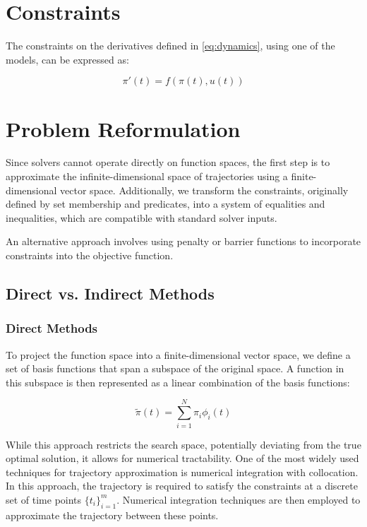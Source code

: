 \section{Constraints}

The constraints on the derivatives defined in \eqref{eq:dynamics}, using one of the models, can be expressed as:

\begin{equation}
	\pi'(t) = f(\pi(t), u(t))
\end{equation}

\section{Problem Reformulation}

Since solvers cannot operate directly on function spaces, the first step is to approximate the infinite-dimensional space of trajectories using a
finite-dimensional vector space.
Additionally, we transform the constraints, originally defined by set membership and predicates, into a system of equalities and inequalities, which
are compatible with standard solver inputs.

An alternative approach involves using penalty or barrier functions to incorporate constraints into the objective function.

\subsection{Direct vs.
	Indirect Methods}

\subsubsection{Direct Methods}

To project the function space into a finite-dimensional
vector space, we define a set of basis functions that span a subspace of the original space.
A function in this subspace is then represented as a linear combination of the basis functions:

\begin{equation}
	\tilde{\pi}(t) = \sum_{i=1}^{N} \pi_i \phi_i(t)
\end{equation}

While this approach restricts the search space, potentially deviating from the true optimal solution, it allows for numerical tractability.
One of the most widely used techniques for trajectory approximation is numerical integration with collocation.
In this approach, the trajectory is required to satisfy the constraints at a discrete set of time points $\{t_i\}_{i=1}^{m}$.
Numerical integration techniques are then employed to approximate the trajectory between these points.

